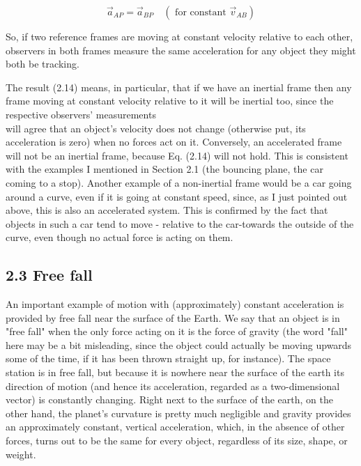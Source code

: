 \documentclass[10pt]{article}
\begin{document}
\begin{equation*}
\vec{a}_{A P}=\vec{a}_{B P} \quad\left(\text { for constant } \vec{v}_{A B}\right) \tag{2.14}
\end{equation*}


So, if two reference frames are moving at constant velocity relative to each other, observers in both frames measure the same acceleration for any object they might both be tracking.

The result (2.14) means, in particular, that if we have an inertial frame then any frame moving at constant velocity relative to it will be inertial too, since the respective observers' measurements\\
will agree that an object's velocity does not change (otherwise put, its acceleration is zero) when no forces act on it. Conversely, an accelerated frame will not be an inertial frame, because Eq. (2.14) will not hold. This is consistent with the examples I mentioned in Section 2.1 (the bouncing plane, the car coming to a stop). Another example of a non-inertial frame would be a car going around a curve, even if it is going at constant speed, since, as I just pointed out above, this is also an accelerated system. This is confirmed by the fact that objects in such a car tend to move - relative to the car-towards the outside of the curve, even though no actual force is acting on them.

\subsection*{2.3 Free fall}
An important example of motion with (approximately) constant acceleration is provided by free fall near the surface of the Earth. We say that an object is in "free fall" when the only force acting on it is the force of gravity (the word "fall" here may be a bit misleading, since the object could actually be moving upwards some of the time, if it has been thrown straight up, for instance). The space station is in free fall, but because it is nowhere near the surface of the earth its direction of motion (and hence its acceleration, regarded as a two-dimensional vector) is constantly changing. Right next to the surface of the earth, on the other hand, the planet's curvature is pretty much negligible and gravity provides an approximately constant, vertical acceleration, which, in the absence of other forces, turns out to be the same for every object, regardless of its size, shape, or weight.
\end{document}
